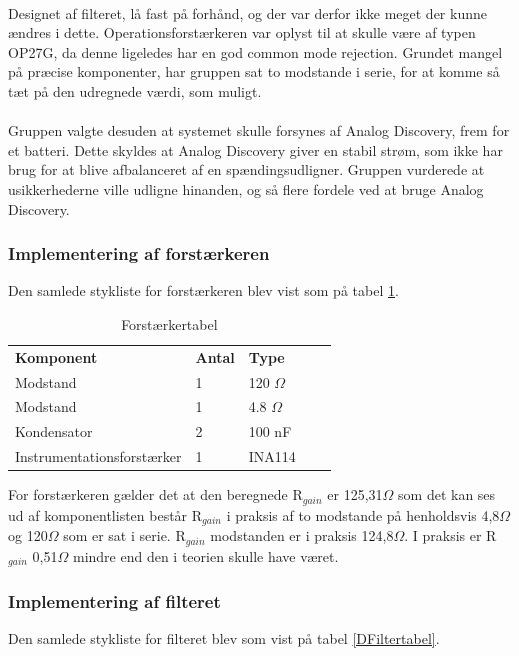 \\
Designet af filteret, lå fast på forhånd, og der var derfor ikke meget der kunne ændres i dette. Operationsforstærkeren var oplyst til at skulle være af typen OP27G, da denne ligeledes har en god common mode rejection. Grundet mangel på præcise komponenter, har gruppen sat to modstande i serie, for at komme så tæt på den udregnede værdi, som muligt. \\
\\
Gruppen valgte desuden at systemet skulle forsynes af Analog Discovery, frem for et batteri. Dette skyldes at Analog Discovery giver en stabil strøm, som ikke har brug for at blive afbalanceret af en spændingsudligner. Gruppen vurderede at usikkerhederne ville udligne hinanden, og så flere fordele ved at bruge Analog Discovery.\\


\subsubsection{Implementering af forstærkeren}
Den samlede stykliste for forstærkeren blev vist som på tabel \ref{DForsttabel}.

\begin{table}[H]
\centering
\begin{tabular}{|l|l|l|ll}
\cline{1-3}
\textbf{Komponent} & \textbf{Antal} & \textbf{Type}  &  &  \\ \cline{1-3}
Modstand           & 1              & 120 $\Omega$   &  &  \\ \cline{1-3}
Modstand           & 1              & 4.8 $\Omega$   &  &  \\ \cline{1-3}
Kondensator        & 2              & 100 nF         &  &  \\ \cline{1-3}
Instrumentationsforstærker &    1   & INA114		     &  &  \\ \cline{1-3}
\end{tabular}
\caption{Forstærkertabel}
\label{DForsttabel}
\end{table}

For forstærkeren gælder det at den beregnede R$_{gain}$ er 125,31$\Omega$ som det kan ses ud af komponentlisten består R$_{gain}$ i praksis af to modstande på henholdsvis 4,8$\Omega$ og 120$\Omega$ som er sat i serie. R$_{gain}$ modstanden er i praksis 124,8$\Omega$. I praksis er R$_{gain}$ 0,51$\Omega$ mindre end den i teorien skulle have været.

\subsubsection{Implementering af filteret}
Den samlede stykliste for filteret blev som vist på tabel \ref{DFiltertabel}.

